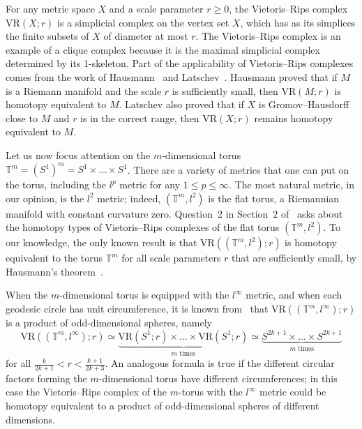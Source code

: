 \documentclass[12pt,a4paper]{amsart}
\theoremstyle{definition}
\newcommand{\T}{\ensuremath{\mathbb{T}}}
\newcommand{\vr}[2]{\mathrm{VR}(#1;#2)}
\numberwithin{equation}{section}
\begin{document}
For any metric space $X$ and a scale parameter $r\ge 0$, the Vietoris--Rips complex $\vr{X}{r}$ is a simplicial complex on the vertex set $X$, which has as its simplices the finite subsets of $X$ of diameter at most $r$.
The Vietoris--Rips complex is an example of a clique complex because it is the maximal simplicial complex determined by its 1-skeleton.
Part of the applicability of Vietoris--Rips complexes comes from the work of Hausmann~\cite{Hausmann1995} and Latschev~\cite{Latschev2001}.
Hausmann proved that if $M$ is a Riemann manifold and the scale $r$ is sufficiently small, then $\vr{M}{r}$ is homotopy equivalent to $M$.
Latschev also proved that if $X$ is Gromov--Hausdorff close to $M$ and $r$ is in the correct range, then $\vr{X}{r}$ remains homotopy equivalent to $M$.

Let us now focus attention on the $m$-dimensional torus $\T^m = (S^1)^m = %
S^1 \times \ldots \times S^1%
$.
There are a variety of metrics that one can put on the torus, including the $l^p$ metric for any $1\le p\le \infty$.
The most natural metric, in our opinion, is the $l^2$ metric; indeed, $(\T^m,l^2)$ is the flat torus, a Riemannian manifold with constant curvature zero.
Question~2 in Section~2 of~\cite{gasarch2017open} asks about the homotopy types of Vietoris--Rips complexes of the flat torus $(\T^m,l^2)$.
To our knowledge, the only known result is that $\vr{(\T^m,l^2)}{r}$ is homotopy equivalent to the torus $\T^m$ for all scale parameters $r$ that are sufficiently small, by Hausmann's theorem~\cite{Hausmann1995}.

When the $m$-dimensional torus is equipped with the $l^\infty$ metric, and when each geodesic circle has unit circumference, it is known from~\cite[Proposition~10.2]{AA-VRS1} that $\vr{(\T^m,l^\infty)}{r}$ is a product of odd-dimensional spheres, namely
\[\vr{(\T^m,l^\infty)}{r} \simeq \underbrace{\vr{S^1}{r} \times \ldots \times \vr{S^1}{r}}_{m\text{ times}} \simeq \underbrace{S^{2k+1} \times \ldots \times S^{2k+1}}_{m\text{ times}}\]
for all $\frac{k}{2k+1}<r<\frac{k+1}{2k+3}$.
An analogous formula is true if the different circular factors forming the $m$-dimensional torus have different circumferences; in this case the Vietoris--Rips complex of the $m$-torus with the $l^\infty$ metric could be homotopy equivalent to a product of odd-dimensional spheres of different dimensions.
\end{document}
